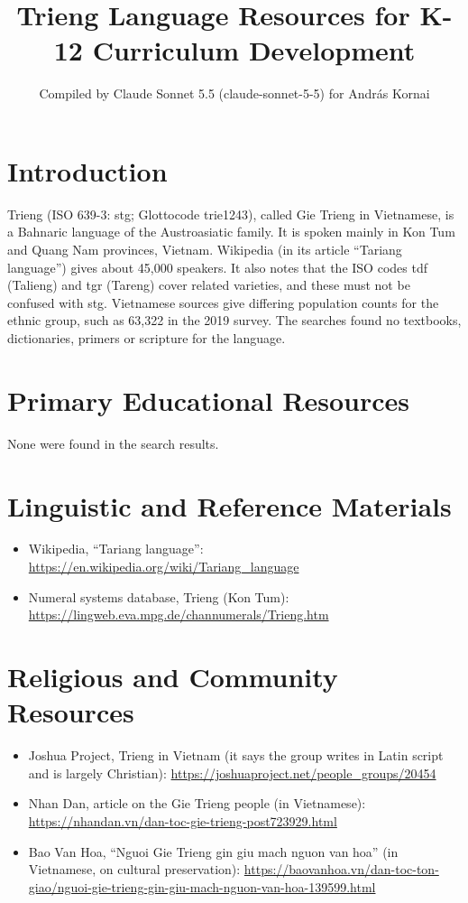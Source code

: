 \documentclass[12pt]{article}
\title{Trieng Language Resources for K-12 Curriculum Development}
\author{Compiled by Claude Sonnet 5.5 (claude-sonnet-5-5) for Andr\'as Kornai}
\date{}
\begin{document}
\maketitle

\section{Introduction}
Trieng (ISO 639-3: stg; Glottocode trie1243), called Gie Trieng in Vietnamese, is a Bahnaric language of the Austroasiatic family. It is spoken mainly in Kon Tum and Quang Nam provinces, Vietnam. Wikipedia (in its article ``Tariang language'') gives about 45,000 speakers. It also notes that the ISO codes tdf (Talieng) and tgr (Tareng) cover related varieties, and these must not be confused with stg. Vietnamese sources give differing population counts for the ethnic group, such as 63,322 in the 2019 survey. The searches found no textbooks, dictionaries, primers or scripture for the language.

\section{Primary Educational Resources}
None were found in the search results.

\section{Linguistic and Reference Materials}
\begin{itemize}
\item Wikipedia, ``Tariang language'': \url{https://en.wikipedia.org/wiki/Tariang_language}
\item Numeral systems database, Trieng (Kon Tum): \url{https://lingweb.eva.mpg.de/channumerals/Trieng.htm}
\end{itemize}

\section{Religious and Community Resources}
\begin{itemize}
\item Joshua Project, Trieng in Vietnam (it says the group writes in Latin script and is largely Christian): \url{https://joshuaproject.net/people_groups/20454}
\item Nhan Dan, article on the Gie Trieng people (in Vietnamese): \url{https://nhandan.vn/dan-toc-gie-trieng-post723929.html}
\item Bao Van Hoa, ``Nguoi Gie Trieng gin giu mach nguon van hoa'' (in Vietnamese, on cultural preservation): \url{https://baovanhoa.vn/dan-toc-ton-giao/nguoi-gie-trieng-gin-giu-mach-nguon-van-hoa-139599.html}
\end{itemize}
\end{document}
